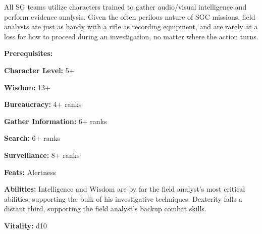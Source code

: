 \begin{multicols}{2}

All SG teams utilize characters trained to gather audio/visual intelligence and perform evidence analysis. Given the often perilous nature of SGC missions, field analysts are just as handy with a rifle as recording equipment, and are rarely at a loss for how to proceed during an investigation, no matter where the action turns.

\columnbreak

\textbf{Prerequisites:} 
\begin{description*}
\item[\hspace{1.5cm}\textbf{Character Level:}] 5+
\item[\hspace{1.5cm}\textbf{Wisdom:}] 13+
\item[\hspace{1.5cm}\textbf{Bureaucracy:}] 4+ ranks
\item[\hspace{1.5cm}\textbf{Gather Information:}] 6+ ranks
\item[\hspace{1.5cm}\textbf{Search:}] 6+ ranks
\item[\hspace{1.5cm}\textbf{Surveillance:}] 8+ ranks
\item[\hspace{1.5cm}\textbf{Feats:}] Alertness
\end{description*}

\textbf{Abilities:} Intelligence and Wisdom are by far the field analyst's most critical abilities, supporting the bulk of his investigative techniques. Dexterity falls a distant third, supporting the field analyst's backup combat skills.

\textbf{Vitality:} d10

\end{multicols}

\setlength{\intextsep}{-3cm}

